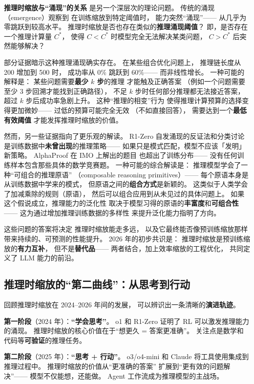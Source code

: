 \textbf{推理时缩放与“涌现”的关系}
是另一个深层次的理论问题。
传统的涌现（emergence）观察到
在训练缩放到特定阈值时，
能力突然“涌现”——
从几乎为零跳跃到较高水平。
推理时缩放是否也存在类似的\textbf{推理涌现阈值}？
即，是否存在一个推理计算量 $C^*$，
使得 $C < C^*$ 时模型完全无法解决某类问题，
$C > C^*$ 后突然能够解决？

部分证据暗示这种推理涌现确实存在。
在某些组合优化问题上，
推理链长度从 200 增加到 500 时，
成功率从 0\% 跳跃到 60\%——
而非线性增长。
一种可能的解释是：
某些问题需要\textbf{最少 $k$ 步}的推理
才能触及正确答案
（例如一个问题需要至少 3 步回溯才能找到正确路径），
不足 $k$ 步时任何部分推理都无法接近答案，
超过 $k$ 步后成功率急剧上升。
这种“推理的相变”行为
使得推理计算预算的选择变得更加微妙——
过低的预算可能完全无效
（不如直接回答），
需要达到一个\textbf{最低有效阈值}
才能发挥推理时缩放的价值。

然而，另一些证据指向了更乐观的解读。
R1-Zero 自发涌现的反证法和分类讨论
是训练数据中\textbf{未曾出现}的推理策略——
如果只是模式匹配，模型不应该「发明」新策略。
AlphaProof 在 IMO 上解出的题目
也超出了训练分布——
没有任何训练样本包含那些具体的数学竞赛题。
一种可能的综合解读是：
推理模型学会了一种“可组合的推理原语”
（composable reasoning primitives）——
每个原语本身是从训练数据中学来的模式，
但原语之间的\textbf{组合方式}是新颖的。
这类似于人类学会了加减乘除的规则（原语），
然后可以组合应用到从未见过的具体问题上。
如果这个假说成立，推理能力的泛化性
取决于模型习得的原语的\textbf{丰富度}和\textbf{可组合性}——
这为通过增加推理训练数据的多样性
来提升泛化能力指明了方向。

这些问题的答案将决定
推理时缩放能走多远，
以及它最终能否像预训练缩放那样
带来持续的、可预测的性能提升。
2026 年的初步共识是：
推理时缩放是预训练缩放的\textbf{有力互补}，
但不是\textbf{替代品}——
两者结合，加上效率缩放的工程优化，
共同定义了 LLM 能力的前沿。

\subsection{推理时缩放的“第二曲线”：从思考到行动}

回顾推理时缩放在 2024--2026 年间的发展，
可以辨识出一条清晰的\textbf{演进轨迹}。

\textbf{第一阶段}（2024 年）：\textbf{“学会思考”}。
o1 和 R1-Zero 证明了 RL 可以激发推理能力的涌现。
推理时缩放的核心价值在于“想更久 = 答案更准确”。
关注点是数学和代码等\textbf{可验证}的推理任务。

\textbf{第二阶段}（2025 年）：\textbf{“思考 + 行动”}。
o3/o4-mini 和 Claude 将工具使用集成到推理过程中。
推理时缩放的价值从“更准确的答案”
扩展到“更有效的问题解决”——
模型不仅能想，还能做。
Agent 工作流成为推理模型的主战场。


